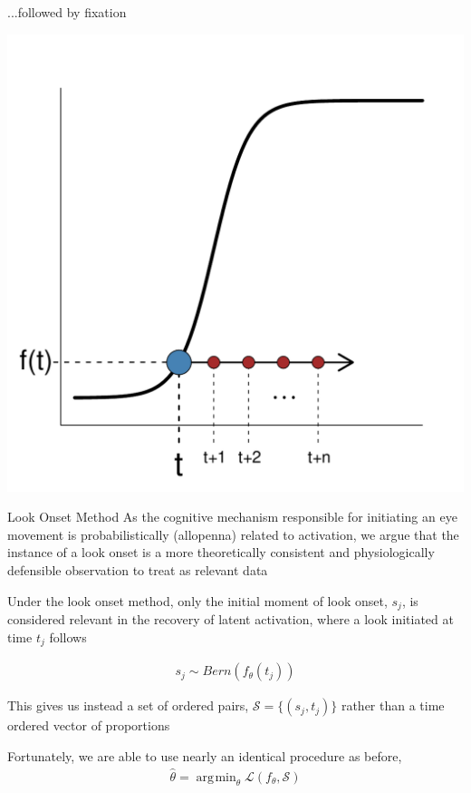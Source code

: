 \documentclass{beamer}
\DeclareMathOperator*{\argmin}{arg\!\min}
\newcommand{\vp}{\vspace{2mm}}
\begin{document}
\begin{frame}{...followed by fixation}
\vspace{-5mm}
\begin{center}
\includegraphics[scale=0.4]{img/logistic_c.pdf}
\end{center}
\end{frame}


\begin{frame}{Look Onset Method}
As the cognitive mechanism responsible for initiating an eye movement is probabilistically (allopenna) related to activation, we argue that the instance of a look onset is a more theoretically consistent and physiologically defensible observation to treat as relevant data \vp

Under the look onset method, only the initial moment of look onset, $s_j$, is considered relevant in the recovery of latent activation, where a look initiated at time $t_j$ follows

\begin{align*}
s_j \sim Bern(f_{\theta}(t_j))
\end{align*}

This gives us instead a set of ordered pairs, $\mathcal{S} = \{(s_j, t_j)\}$ rather than a time ordered vector of proportions \\ \vp

Fortunately, we are able to use nearly an identical procedure as before, 
\begin{align*}
\hat{\theta} = \argmin_{\theta} \mathcal{L}(f_{\theta}, \mathcal{S})
\end{align*}
\end{frame}
\end{document}
